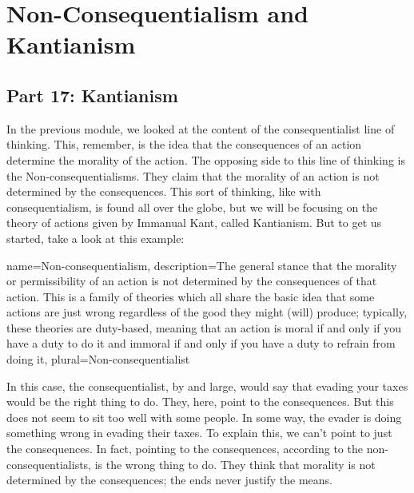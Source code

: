 \part{Non-Consequentialism and Kantianism}
\label{ch.mod6}
\chapter{Part 17: Kantianism}
In the previous module, we looked at the content of the consequentialist line of thinking. This, remember, is the idea that the consequences of an action determine the morality of the action. The opposing side to this line of thinking is the \glspl{Non-consequentialism}. They claim that the morality of an action is not determined by the consequences. This sort of thinking, like with consequentialism, is found all over the globe, but we will be focusing on the theory of actions given by Immanual Kant, called Kantianism. But to get us started, take a look at this example:

{
  name=Non-consequentialism,
  description={The general stance that the morality or permissibility of an action is not determined by the consequences of that action. This is a family of theories which all share the basic idea that some actions are just wrong regardless of the good they might (will) produce; typically, these theories are duty-based, meaning that an action is moral if and only if you have a duty to do it and immoral if and only if you have a duty to refrain from doing it},
  plural=Non-consequentialist
}



In this case, the consequentialist, by and large, would say that evading your taxes would be the right thing to do. They, here, point to the consequences. But this does not seem to sit too well with some people. In some way, the evader is doing something wrong in evading their taxes. To explain this, we can't point to just the consequences. In fact, pointing to the consequences, according to the non-consequentialists, is the wrong thing to do. They think that morality is not determined by the consequences; the ends never justify the means.

